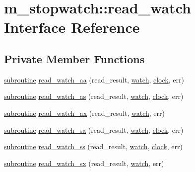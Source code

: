\hypertarget{interfacem__stopwatch_1_1read__watch}{}\section{m\+\_\+stopwatch\+:\+:read\+\_\+watch Interface Reference}
\label{interfacem__stopwatch_1_1read__watch}
\subsection*{Private Member Functions}
\begin{DoxyCompactItemize}
\item 
\hyperlink{M__stopwatch_83_8txt_acfbcff50169d691ff02d4a123ed70482}{subroutine} \hyperlink{interfacem__stopwatch_1_1read__watch_a01c2b86754ccb62e2277b9939ef62f71}{read\+\_\+watch\+\_\+aa} (read\+\_\+result, \hyperlink{read__watch_83_8txt_ad2129669fa47b8899641309620add095}{watch}, \hyperlink{stop__watch_83_8txt_a148c035b430d6edf5413dbd2704facfb}{clock}, err)
\item 
\hyperlink{M__stopwatch_83_8txt_acfbcff50169d691ff02d4a123ed70482}{subroutine} \hyperlink{interfacem__stopwatch_1_1read__watch_ac1b013c2331a6ee1e13f31d7c7da59de}{read\+\_\+watch\+\_\+as} (read\+\_\+result, \hyperlink{read__watch_83_8txt_ad2129669fa47b8899641309620add095}{watch}, \hyperlink{stop__watch_83_8txt_a148c035b430d6edf5413dbd2704facfb}{clock}, err)
\item 
\hyperlink{M__stopwatch_83_8txt_acfbcff50169d691ff02d4a123ed70482}{subroutine} \hyperlink{interfacem__stopwatch_1_1read__watch_a1db6c4e1d66e176144333144958d2c8e}{read\+\_\+watch\+\_\+ax} (read\+\_\+result, \hyperlink{read__watch_83_8txt_ad2129669fa47b8899641309620add095}{watch}, err)
\item 
\hyperlink{M__stopwatch_83_8txt_acfbcff50169d691ff02d4a123ed70482}{subroutine} \hyperlink{interfacem__stopwatch_1_1read__watch_a7453d6e0810a493a5551168714c27915}{read\+\_\+watch\+\_\+sa} (read\+\_\+result, \hyperlink{read__watch_83_8txt_ad2129669fa47b8899641309620add095}{watch}, \hyperlink{stop__watch_83_8txt_a148c035b430d6edf5413dbd2704facfb}{clock}, err)
\item 
\hyperlink{M__stopwatch_83_8txt_acfbcff50169d691ff02d4a123ed70482}{subroutine} \hyperlink{interfacem__stopwatch_1_1read__watch_a3bb5eac4c79730cf2d31629d11046f26}{read\+\_\+watch\+\_\+ss} (read\+\_\+result, \hyperlink{read__watch_83_8txt_ad2129669fa47b8899641309620add095}{watch}, \hyperlink{stop__watch_83_8txt_a148c035b430d6edf5413dbd2704facfb}{clock}, err)
\item 
\hyperlink{M__stopwatch_83_8txt_acfbcff50169d691ff02d4a123ed70482}{subroutine} \hyperlink{interfacem__stopwatch_1_1read__watch_ab4f2a9002e2bd063065239e88f50a6b8}{read\+\_\+watch\+\_\+sx} (read\+\_\+result, \hyperlink{read__watch_83_8txt_ad2129669fa47b8899641309620add095}{watch}, err)
\end{DoxyCompactItemize}


